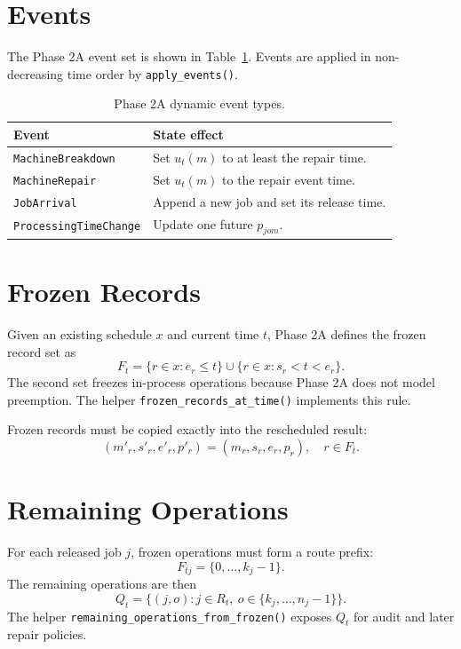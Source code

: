 \documentclass[11pt]{article}
\begin{document}
\section{Events}

The Phase 2A event set is shown in Table~\ref{tab:events}. Events are applied in
non-decreasing time order by \texttt{apply\_events()}.

\begin{table}[h]
\centering
\begin{tabular}{ll}
\toprule
Event & State effect \\
\midrule
\texttt{MachineBreakdown} & Set $u_t(m)$ to at least the repair time. \\
\texttt{MachineRepair} & Set $u_t(m)$ to the repair event time. \\
\texttt{JobArrival} & Append a new job and set its release time. \\
\texttt{ProcessingTimeChange} & Update one future $p_{jom}$. \\
\bottomrule
\end{tabular}
\caption{Phase 2A dynamic event types.}
\label{tab:events}
\end{table}

\section{Frozen Records}

Given an existing schedule $x$ and current time $t$, Phase 2A defines the frozen
record set as
\[
  F_t =
  \{r \in x : e_r \le t\}
  \cup
  \{r \in x : s_r < t < e_r\}.
\]
The second set freezes in-process operations because Phase 2A does not model
preemption. The helper \texttt{frozen\_records\_at\_time()} implements this rule.

Frozen records must be copied exactly into the rescheduled result:
\[
  (m'_r,s'_r,e'_r,p'_r) = (m_r,s_r,e_r,p_r), \quad r \in F_t.
\]

\section{Remaining Operations}

For each released job $j$, frozen operations must form a route prefix:
\[
  F_{tj} = \{0,\ldots,k_j-1\}.
\]
The remaining operations are then
\[
  Q_t = \{(j,o): j \in R_t,\ o \in \{k_j,\ldots,n_j-1\}\}.
\]
The helper \texttt{remaining\_operations\_from\_frozen()} exposes $Q_t$ for audit
and later repair policies.
\end{document}

